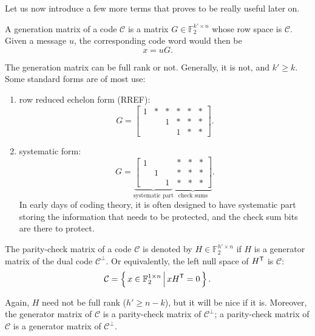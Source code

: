 Let us now introduce a few more terms that proves to be really useful later on.

\begin{definition}
    A generation matrix of a code $\mathcal{C}$ is a matrix $G\in\mathbb{F}_2^{k'\times n}$ whose row space is $\mathcal{C}$. Given a message $u$, the corresponding code word would then be
    \begin{equation}
        x = uG.
    \end{equation}
\end{definition}

The generation matrix can be full rank or not. Generally, it is not, and $k'\ge k$. Some standard forms are of most use:
\begin{enumerate}
    \item row reduced echelon form (RREF):
    \begin{equation*}
        G = \left[\begin{matrix}
            1 & * & * & * & * & * \\
            ~ & ~ & 1 & * & * & * \\
            ~ & ~ & ~ & 1 & * & *
        \end{matrix}\right].
    \end{equation*}
    \item systematic form:
    \begin{equation*}
        G = \underbrace{\left[\begin{matrix}
            1 & ~ & ~ \\
            ~ & 1 & ~ \\
            ~ & ~ & 1 
        \end{matrix}\right.}_{\text{systematic part}}\underbrace{\left.\begin{matrix}
            * & * & * \\
            * & * & * \\
            * & * & * 
        \end{matrix}\right]}_{\text{check sums}}.
    \end{equation*}
    In early days of coding theory, it is often designed to have systematic part storing the information that needs to be protected, and the check sum bits are there to protect.
\end{enumerate}
\begin{definition}
    The parity-check matrix of a code $\mathcal{C}$ is denoted by $H\in\mathbb{F}_2^{ h'\times n}$ if $H$ is a generator matrix of the dual code $\mathcal{C}^\perp$. Or equivalently, the left null space of $H^{\mathsf{T}}$ is $\mathcal{C}$:
    \begin{equation}
        \mathcal{C} = \left\{\,{x\in\mathbb{F}_2^{1\times n}}\,\middle\vert\,{xH^{\mathsf{T}}=0}\,\right\}.
    \end{equation}
\end{definition}
Again, $H$ need not be full rank ($h'\ge n-k$), but it will be nice if it is. Moreover, the generator matrix of $\mathcal{C}$ is a parity-check matrix of $\mathcal{C}^\perp$; a parity-check matrix of $\mathcal{C}$ is a generator matrix of $\mathcal{C}^\perp$.

